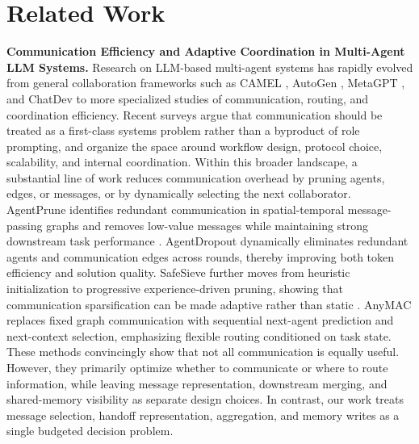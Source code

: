 \documentclass{article} %
\begin{document}
\section{Related Work}
\label{sec:related}
\textbf{Communication Efficiency and Adaptive Coordination in Multi-Agent LLM Systems.}
Research on LLM-based multi-agent systems has rapidly evolved from general collaboration frameworks such as CAMEL \cite{li2023camel}, AutoGen \cite{wu2023autogen}, MetaGPT \cite{hong2024metagpt}, and ChatDev \cite{qian2024chatdev} to more specialized studies of communication, routing, and coordination efficiency. Recent surveys  \cite{li2024llmmas_survey,yan2025beyondselftalk} argue that communication should be treated as a first-class systems problem rather than a byproduct of role prompting, and organize the space around workflow design, protocol choice, scalability, and internal coordination. Within this broader landscape, a substantial line of work reduces communication overhead by pruning agents, edges, or messages, or by dynamically selecting the next collaborator. AgentPrune identifies redundant communication in spatial-temporal message-passing graphs and removes low-value messages while maintaining strong downstream task performance \cite{zhang2025agentprune}. AgentDropout \cite{wang2025agentdropout} dynamically eliminates redundant agents and communication edges across rounds, thereby improving both token efficiency and solution quality. SafeSieve further moves from heuristic initialization to progressive experience-driven pruning, showing that communication sparsification can be made adaptive rather than static \cite{zhang2025safesieve}. AnyMAC \cite{wang2025anymac} replaces fixed graph communication with sequential next-agent prediction and next-context selection, emphasizing flexible routing conditioned on task state. These methods convincingly show that not all communication is equally useful. However, they primarily optimize whether to communicate or where to route information, while leaving message representation, downstream merging, and shared-memory visibility as separate design choices. In contrast, our work treats message selection, handoff representation, aggregation, and memory writes as a single budgeted decision problem.
\end{document}
